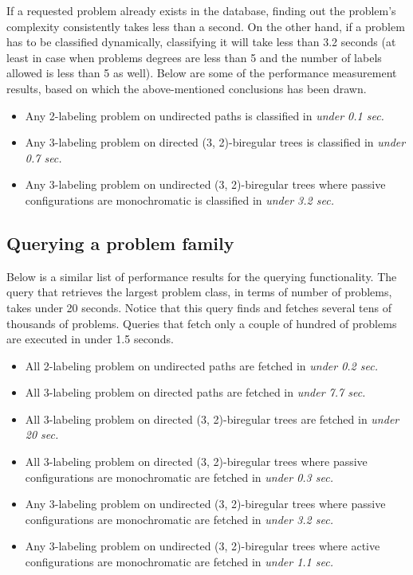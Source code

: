 If a requested problem already exists in the database, finding out
the problem's complexity consistently takes less than a second.
On the other hand, if a problem has to be classified dynamically,
classifying it will take less than 3.2 seconds (at least in case when
problems degrees are less than 5 and the number of labels allowed is less
than 5 as well). Below are some of the performance measurement results,
based on which the above-mentioned conclusions has been drawn.

\begin{itemize}
  \item Any 2-labeling problem on undirected paths is classified in \emph{under 0.1 sec.}
  \item Any 3-labeling problem on directed (3, 2)-biregular trees is classified in \emph{under 0.7 sec.}
  \item Any 3-labeling problem on undirected (3, 2)-biregular trees where passive configurations are monochromatic is classified in \emph{under 3.2 sec.}
\end{itemize}

\subsection{Querying a problem family}

Below is a similar list of performance results for the querying
functionality. The query that retrieves the largest problem class, in terms of
number of problems, takes under 20 seconds. Notice that this query
finds and fetches several tens of thousands of problems. Queries
that fetch only a couple of hundred of problems are executed in under 1.5 seconds.

\begin{itemize}
  \item All 2-labeling problem on undirected paths are fetched in \emph{under 0.2 sec.}
  \item All 3-labeling problem on directed paths are fetched in \emph{under 7.7 sec.}
  \item All 3-labeling problem on directed (3, 2)-biregular trees are fetched in \emph{under 20 sec.}
  \item All 3-labeling problem on directed (3, 2)-biregular trees where passive configurations are monochromatic are fetched in \emph{under 0.3 sec.}
  \item Any 3-labeling problem on undirected (3, 2)-biregular trees where passive configurations are monochromatic are fetched in \emph{under 3.2 sec.}
  \item Any 3-labeling problem on undirected (3, 2)-biregular trees where active configurations are monochromatic are fetched in \emph{under 1.1 sec.}
\end{itemize}


